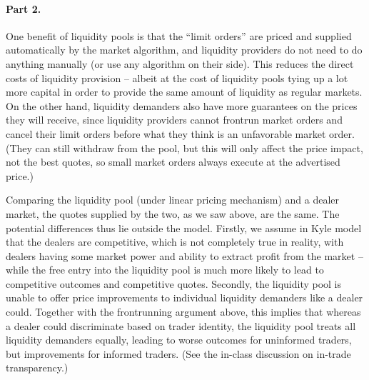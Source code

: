\begin{solution}
	\paragraph{Part 2.}
	One benefit of liquidity pools is that the ``limit orders'' are priced and supplied automatically by the market algorithm, and liquidity providers do not need to do anything manually (or use any algorithm on their side). This reduces the direct costs of liquidity provision -- albeit at the cost of liquidity pools tying up a lot more capital in order to provide the same amount of liquidity as regular markets.
	On the other hand, liquidity demanders also have more guarantees on the prices they will receive, since liquidity providers cannot frontrun market orders and cancel their limit orders before what they think is an unfavorable market order. (They can still withdraw from the pool, but this will only affect the price impact, not the best quotes, so small market orders always execute at the advertised price.)
	
	Comparing the liquidity pool (under linear pricing mechanism) and a dealer market, the quotes supplied by the two, as we saw above, are the same. The potential differences thus lie outside the model. Firstly, we assume in Kyle model that the dealers are competitive, which is not completely true in reality, with dealers having some market power and ability to extract profit from the market -- while the free entry into the liquidity pool is much more likely to lead to competitive outcomes and competitive quotes. Secondly, the liquidity pool is unable to offer price improvements to individual liquidity demanders like a dealer could. Together with the frontrunning argument above, this implies that whereas a dealer could discriminate based on trader identity, the liquidity pool treats all liquidity demanders equally, leading to worse outcomes for uninformed traders, but improvements for informed traders. (See the in-class discussion on in-trade transparency.)
	

\end{solution}
